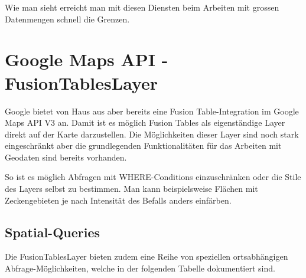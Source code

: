 Wie man sieht erreicht man mit diesen Diensten beim Arbeiten mit grossen Datenmengen schnell die Grenzen.

\section{Google Maps API - FusionTablesLayer}
\label{gmap-api-fusiontableslayer}
Google bietet von Haus aus aber bereits eine Fusion Table-Integration im Google Maps API V3 an. Damit ist es möglich Fusion Tables als eigenständige Layer direkt auf der Karte darzustellen.
Die Möglichkeiten dieser Layer sind noch stark eingeschränkt aber die grundlegenden Funktionalitäten für das Arbeiten mit Geodaten sind bereits vorhanden.

So ist es möglich Abfragen mit WHERE-Conditions einzuschränken oder die Stile des Layers selbst zu bestimmen. Man kann beispielsweise Flächen mit Zeckengebieten je nach Intensität des Befalls anders einfärben.

\subsection{Spatial-Queries}
\label{sqlapi-spatialqueries}
Die FusionTablesLayer bieten zudem eine Reihe von speziellen ortsabhängigen Abfrage-Möglichkeiten, welche in der folgenden Tabelle dokumentiert sind.

